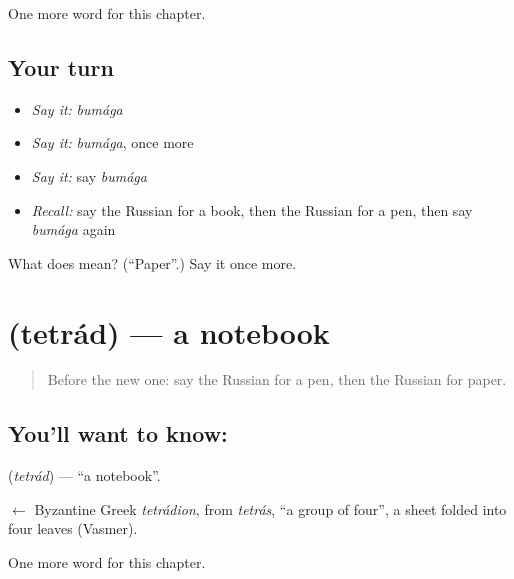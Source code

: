 \begin{grammarlens}[title={What you've built}]
One more word for this chapter.
\end{grammarlens}

\subsection*{Your turn}
\begin{itemize}
\raggedright
  \item \emph{Say it:} \emph{bumága}
  \item \emph{Say it:} \emph{bumága}, once more
  \item \emph{Say it:} say \emph{bumága}
  \item \emph{Recall:} say the Russian for a book, then the Russian for a pen, then say \emph{bumága} again
\end{itemize}

\begin{tcolorbox}[breakable,colback=teal!4,colframe=teal!35!black,title={Before you move on}]
What does  mean? (\textquotedblleft{}Paper\textquotedblright{}.) Say it once more.
\end{tcolorbox}
\section[\texorpdfstring{\ru{тетрадь} (tetrád)}{тетрадь (tetrád)}]{ (tetrád) — a notebook}

\label{lesson:RU-C52-notebook}



\begin{quote}
Before the new one: say the Russian for a pen, then the Russian for paper.
\end{quote}

\subsection*{You'll want to know: }
\textbf{} (\emph{tetrád}) — \textquotedblleft{}a notebook\textquotedblright{}.

\begin{cousinweb}
\textbf{} $\leftarrow$ Byzantine Greek \emph{tetrádion}, from \emph{tetrás}, \textquotedblleft{}a group of four\textquotedblright{}, a sheet folded into four leaves (Vasmer).
\end{cousinweb}

\begin{grammarlens}[title={What you've built}]
One more word for this chapter.
\end{grammarlens}

